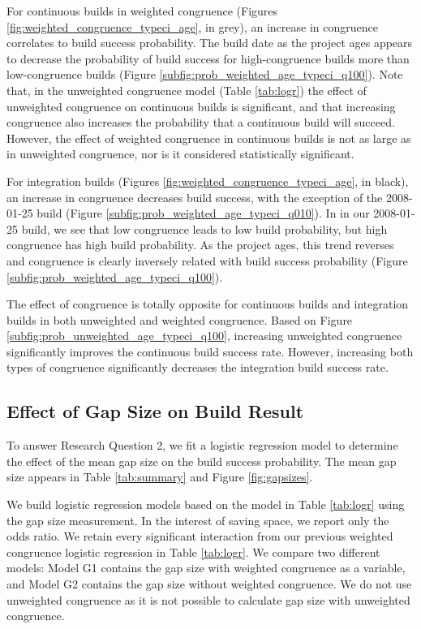 For continuous builds in weighted congruence (Figures \ref{fig:weighted_congruence_typeci_age}, in grey), an increase in congruence correlates to build success probability. The build date as the project ages appears to decrease the probability of build success for high-congruence builds more than low-congruence builds (Figure \ref{subfig:prob_weighted_age_typeci_q100}). Note that, in the unweighted congruence model (Table \ref{tab:logr}) the effect of unweighted congruence on continuous builds is significant, and that increasing congruence also increases the probability that a continuous build will succeed. However, the effect of weighted congruence in continuous builds is not as large as in unweighted congruence, nor is it considered statistically significant.

For integration builds (Figures \ref{fig:weighted_congruence_typeci_age}, in black), an increase in congruence decreases build success, with the exception of the 2008-01-25 build (Figure \ref{subfig:prob_weighted_age_typeci_q010}). In in our 2008-01-25 build, we see that low congruence leads to low build probability, but high congruence has high build probability. As the project ages, this trend reverses and congruence is clearly inversely related with build success probability (Figure \ref{subfig:prob_weighted_age_typeci_q100}).

The effect of congruence is totally opposite for continuous builds and integration builds in both unweighted and weighted congruence. Based on Figure \ref{subfig:prob_unweighted_age_typeci_q100}, increasing unweighted congruence significantly improves the continuous build success rate. However, increasing both types of congruence significantly decreases the integration build success rate.


\subsection{Effect of Gap Size on Build Result}
\label{sec:gapsizeresult}
To answer Research Question 2, we fit a logistic regression model to determine the effect of the mean gap size on the build success probability. The mean gap size appears in Table \ref{tab:summary} and Figure \ref{fig:gapsizes}.

We build logistic regression models based on the model in Table \ref{tab:logr} using the gap size measurement. In the interest of saving space, we report only the odds ratio. We retain every significant interaction from our previous weighted congruence logistic regression in Table \ref{tab:logr}.
We compare two different models: Model G1 contains the gap size with weighted congruence as a variable, and Model G2 contains the gap size without weighted congruence.  We do not use unweighted congruence as it is not possible to calculate gap size with unweighted congruence.


